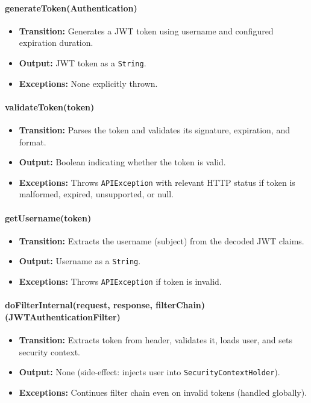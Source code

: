 \documentclass[12pt, titlepage]{article}
\begin{document}
\paragraph{generateToken(Authentication)}
\begin{itemize}
    \item \textbf{Transition:} Generates a JWT token using username and configured expiration duration.
    \item \textbf{Output:} JWT token as a \texttt{String}.
    \item \textbf{Exceptions:} None explicitly thrown.
\end{itemize}

\paragraph{validateToken(token)}
\begin{itemize}
    \item \textbf{Transition:} Parses the token and validates its signature, expiration, and format.
    \item \textbf{Output:} Boolean indicating whether the token is valid.
    \item \textbf{Exceptions:} Throws \texttt{APIException} with relevant HTTP status if token is malformed, expired, unsupported, or null.
\end{itemize}

\paragraph{getUsername(token)}
\begin{itemize}
    \item \textbf{Transition:} Extracts the username (subject) from the decoded JWT claims.
    \item \textbf{Output:} Username as a \texttt{String}.
    \item \textbf{Exceptions:} Throws \texttt{APIException} if token is invalid.
\end{itemize}

\paragraph{doFilterInternal(request, response, filterChain) (JWTAuthenticationFilter)}
\begin{itemize}
    \item \textbf{Transition:} Extracts token from header, validates it, loads user, and sets security context.
    \item \textbf{Output:} None (side-effect: injects user into \texttt{SecurityContextHolder}).
    \item \textbf{Exceptions:} Continues filter chain even on invalid tokens (handled globally).
\end{itemize}
\end{document}
